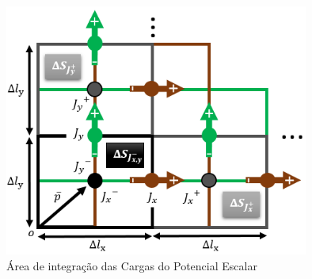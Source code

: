\documentclass[
	12pt,				%
	openright,			%
	oneside,			%
	a4papey79r,			%
	english,			%
	brazil				%
	]{abntex2}
\begin{document}
\begin{figure}[htb]
 \label{CargasDeltaSIlustracao}
 \centering
  \begin{minipage}{\textwidth}
    \centering
    \caption{Área de integração das Cargas do Potencial Escalar} \label{fig_minipage_imagem2}
    \includegraphics[width=10cm]{figures/CargasDeltaSIlustracao.png}
  \end{minipage}
  \hfill

\end{figure}
\end{document}
